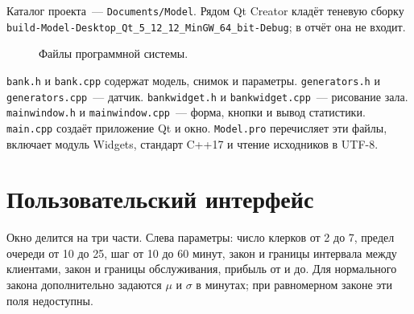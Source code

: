 \documentclass[a4paper,12pt]{article}
\begin{document}
Каталог проекта~--- \texttt{Documents/Model}. Рядом Qt Creator кладёт теневую сборку \texttt{build-Model-Desktop\_Qt\_5\_12\_12\_MinGW\_64\_bit-Debug}; в отчёт она не входит.

\begin{figure}[H]
\centering
{}
\caption{Файлы программной системы.}
\label{fig:files}
\end{figure}

\texttt{bank.h} и \texttt{bank.cpp} содержат модель, снимок и параметры. \texttt{generators.h} и \texttt{generators.cpp}~--- датчик. \texttt{bankwidget.h} и \texttt{bankwidget.cpp}~--- рисование зала. \texttt{mainwindow.h} и \texttt{mainwindow.cpp}~--- форма, кнопки и вывод статистики. \texttt{main.cpp} создаёт приложение Qt и окно. \texttt{Model.pro} перечисляет эти файлы, включает модуль Widgets, стандарт C++17 и чтение исходников в UTF-8.

\section{Пользовательский интерфейс}

Окно делится на три части. Слева параметры: число клерков от 2 до 7, предел очереди от 10 до 25, шаг от 10 до 60 минут, закон и границы интервала между клиентами, закон и границы обслуживания, прибыль от и до. Для нормального закона дополнительно задаются \(\mu\) и \(\sigma\) в минутах; при равномерном законе эти поля недоступны.
\end{document}
